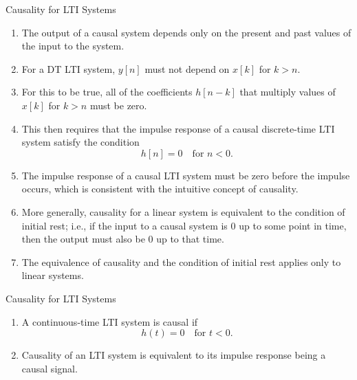 \begin{frame}{Causality for LTI Systems}

    \begin{enumerate}
        \item The output of a causal system depends only on the present and past values of the input to the system.
        \item For a DT LTI system, $y[n]$ must not depend on $x[k]$ for $k > n$.
        \item For this to be true, all of the coefficients $h[n- k]$ that multiply values of $x[k]$ for $k > n$ must be zero.
        \item This then requires that the impulse response of a causal discrete-time LTI system satisfy the condition
            \begin{equation*}
                h[n] = 0\quad \text{for } n < 0.
            \end{equation*}
        \item The impulse response of a causal LTI system must be zero before the impulse occurs, which is consistent with the intuitive concept of causality.
        \item More generally, causality for a linear system is equivalent to the condition of initial rest; i.e., if the input to a causal system is 0 up to some point in time, then the output must also be 0 up to that time.
        \item The equivalence of causality and the condition of initial rest applies only to linear systems.
    \end{enumerate}
\end{frame}

\begin{frame}{Causality for LTI Systems}

    \begin{enumerate}
        \item A continuous-time LTI system is causal if
            \begin{equation*}
                h(t) = 0\quad \text{for } t < 0.
            \end{equation*}
        \item Causality of an LTI system is equivalent to its impulse response being a causal signal.
    \end{enumerate}
\end{frame}


